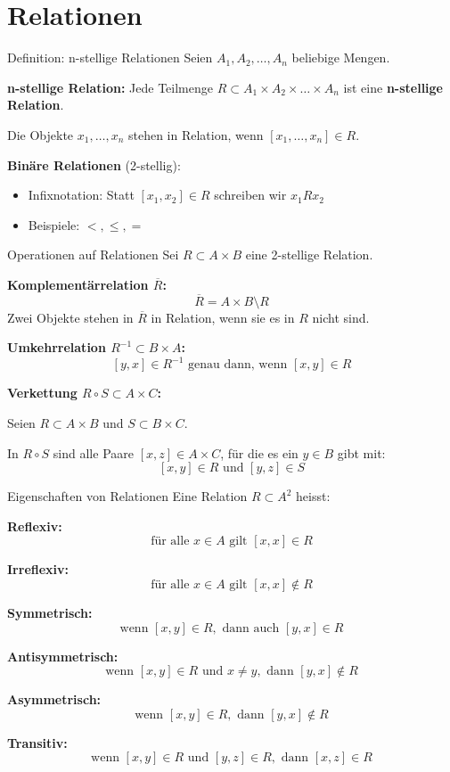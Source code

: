 \documentclass[a4paper, fontsize=7pt]{scrartcl}
\begin{document}
\section{Relationen}

\begin{mainbox}{Definition: n-stellige Relationen}
Seien $A_1, A_2, \ldots, A_n$ beliebige Mengen.

\textbf{n-stellige Relation:}
Jede Teilmenge $R \subset A_1 \times A_2 \times \ldots \times A_n$ ist eine \textbf{n-stellige Relation}.

Die Objekte $x_1, \ldots, x_n$ stehen in Relation, wenn $[x_1, \ldots, x_n] \in R$.

\textbf{Bin\"are Relationen} (2-stellig):
\begin{itemize}
    \item Infixnotation: Statt $[x_1, x_2] \in R$ schreiben wir $x_1 R x_2$
    \item Beispiele: $<, \leq, =$
\end{itemize}
\end{mainbox}

\begin{mainbox}{Operationen auf Relationen}
Sei $R \subset A \times B$ eine 2-stellige Relation.

\textbf{Komplement\"arrelation $\overline{R}$:}
$$\overline{R} = A \times B \setminus R$$
Zwei Objekte stehen in $\overline{R}$ in Relation, wenn sie es in $R$ nicht sind.

\textbf{Umkehrrelation $R^{-1} \subset B \times A$:}
$$[y, x] \in R^{-1} \text{ genau dann, wenn } [x, y] \in R$$

\textbf{Verkettung $R \circ S \subset A \times C$:}

Seien $R \subset A \times B$ und $S \subset B \times C$.

In $R \circ S$ sind alle Paare $[x, z] \in A \times C$, f\"ur die es ein $y \in B$ gibt mit:
$$[x, y] \in R \text{ und } [y, z] \in S$$
\end{mainbox}

\begin{mainbox}{Eigenschaften von Relationen}
Eine Relation $R \subset A^2$ heisst:

\textbf{Reflexiv:}
$$\text{f\"ur alle } x \in A \text{ gilt } [x, x] \in R$$

\textbf{Irreflexiv:}
$$\text{f\"ur alle } x \in A \text{ gilt } [x, x] \notin R$$

\textbf{Symmetrisch:}
$$\text{wenn } [x, y] \in R, \text{ dann auch } [y, x] \in R$$

\textbf{Antisymmetrisch:}
$$\text{wenn } [x, y] \in R \text{ und } x \neq y, \text{ dann } [y, x] \notin R$$

\textbf{Asymmetrisch:}
$$\text{wenn } [x, y] \in R, \text{ dann } [y, x] \notin R$$

\textbf{Transitiv:}
$$\text{wenn } [x, y] \in R \text{ und } [y, z] \in R, \text{ dann } [x, z] \in R$$
\end{mainbox}
\end{document}
